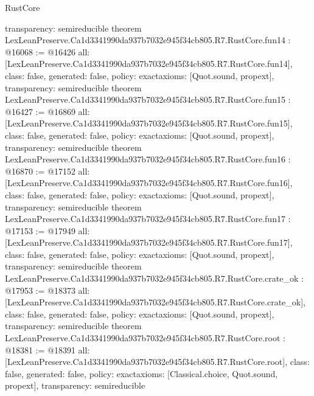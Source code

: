 \begin{lexlean}{RustCore}
\begin{coremodule}
{  transparency: semireducible
}
theorem LexLeanPreserve.Ca1d3341990da937b7032e945f34cb805.R7.RustCore.fun14 : @16068 := @16426 {
  all: [LexLeanPreserve.Ca1d3341990da937b7032e945f34cb805.R7.RustCore.fun14],
  class: false,
  generated: false,
  policy: exact{axioms: [Quot.sound, propext]},
  transparency: semireducible
}
theorem LexLeanPreserve.Ca1d3341990da937b7032e945f34cb805.R7.RustCore.fun15 : @16427 := @16869 {
  all: [LexLeanPreserve.Ca1d3341990da937b7032e945f34cb805.R7.RustCore.fun15],
  class: false,
  generated: false,
  policy: exact{axioms: [Quot.sound, propext]},
  transparency: semireducible
}
theorem LexLeanPreserve.Ca1d3341990da937b7032e945f34cb805.R7.RustCore.fun16 : @16870 := @17152 {
  all: [LexLeanPreserve.Ca1d3341990da937b7032e945f34cb805.R7.RustCore.fun16],
  class: false,
  generated: false,
  policy: exact{axioms: [Quot.sound, propext]},
  transparency: semireducible
}
theorem LexLeanPreserve.Ca1d3341990da937b7032e945f34cb805.R7.RustCore.fun17 : @17153 := @17949 {
  all: [LexLeanPreserve.Ca1d3341990da937b7032e945f34cb805.R7.RustCore.fun17],
  class: false,
  generated: false,
  policy: exact{axioms: [Quot.sound, propext]},
  transparency: semireducible
}
theorem LexLeanPreserve.Ca1d3341990da937b7032e945f34cb805.R7.RustCore.crate_ok : @17953 := @18373 {
  all: [LexLeanPreserve.Ca1d3341990da937b7032e945f34cb805.R7.RustCore.crate_ok],
  class: false,
  generated: false,
  policy: exact{axioms: [Quot.sound, propext]},
  transparency: semireducible
}
theorem LexLeanPreserve.Ca1d3341990da937b7032e945f34cb805.R7.RustCore.root : @18381 := @18391 {
  all: [LexLeanPreserve.Ca1d3341990da937b7032e945f34cb805.R7.RustCore.root],
  class: false,
  generated: false,
  policy: exact{axioms: [Classical.choice, Quot.sound, propext]},
  transparency: semireducible
}


\end{coremodule}
\end{lexlean}

